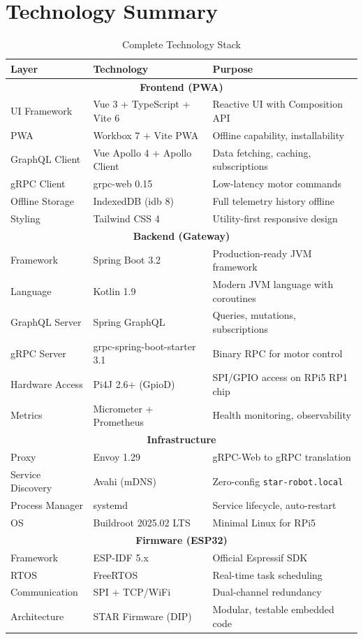 \section{Technology Summary}

\begin{table}[H]
\centering
\small
\begin{tabularx}{\textwidth}{|l|l|X|}
\hline
\textbf{Layer} & \textbf{Technology} & \textbf{Purpose} \\
\hline
\multicolumn{3}{|c|}{\textbf{Frontend (PWA)}} \\
\hline
UI Framework & Vue 3 + TypeScript + Vite 6 & Reactive UI with Composition API \\
PWA & Workbox 7 + Vite PWA & Offline capability, installability \\
GraphQL Client & Vue Apollo 4 + Apollo Client & Data fetching, caching, subscriptions \\
gRPC Client & grpc-web 0.15 & Low-latency motor commands \\
Offline Storage & IndexedDB (idb 8) & Full telemetry history offline \\
Styling & Tailwind CSS 4 & Utility-first responsive design \\
\hline
\multicolumn{3}{|c|}{\textbf{Backend (Gateway)}} \\
\hline
Framework & Spring Boot 3.2 & Production-ready JVM framework \\
Language & Kotlin 1.9 & Modern JVM language with coroutines \\
GraphQL Server & Spring GraphQL & Queries, mutations, subscriptions \\
gRPC Server & grpc-spring-boot-starter 3.1 & Binary RPC for motor control \\
Hardware Access & Pi4J 2.6+ (GpioD) & SPI/GPIO access on RPi5 RP1 chip \\
Metrics & Micrometer + Prometheus & Health monitoring, observability \\
\hline
\multicolumn{3}{|c|}{\textbf{Infrastructure}} \\
\hline
Proxy & Envoy 1.29 & gRPC-Web to gRPC translation \\
Service Discovery & Avahi (mDNS) & Zero-config \texttt{star-robot.local} \\
Process Manager & systemd & Service lifecycle, auto-restart \\
OS & Buildroot 2025.02 LTS & Minimal Linux for RPi5 \\
\hline
\multicolumn{3}{|c|}{\textbf{Firmware (ESP32)}} \\
\hline
Framework & ESP-IDF 5.x & Official Espressif SDK \\
RTOS & FreeRTOS & Real-time task scheduling \\
Communication & SPI + TCP/WiFi & Dual-channel redundancy \\
Architecture & STAR Firmware (DIP) & Modular, testable embedded code \\
\hline
\end{tabularx}
\caption{Complete Technology Stack}
\end{table}

